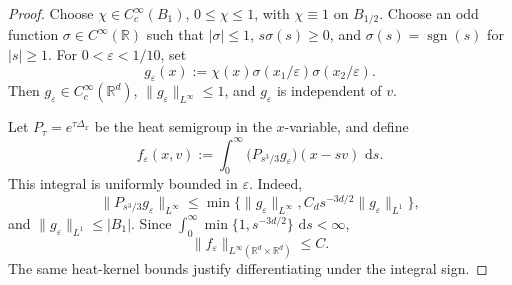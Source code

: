 \documentclass[11pt,reqno]{amsart}
\numberwithin{equation}{section}
\theoremstyle{remark}
\newcommand{\R}{\mathbb{R}}
\newcommand{\dd}{\,\mathrm{d}}
\begin{document}
\begin{proof}
Choose \(\chi\in C_c^\infty(B_1)\), \(0\le\chi\le1\), with
\(\chi\equiv1\) on \(B_{1/2}\).  Choose an odd function
\(\sigma\in C^\infty(\R)\) such that \(|\sigma|\le1\),
\(s\sigma(s)\ge0\), and \(\sigma(s)=\operatorname{sgn}(s)\) for
\(|s|\ge1\).  For \(0<\varepsilon<1/10\), set
\begin{equation}\label{eq:g-eps-def}
   g_\varepsilon(x)
   :=\chi(x)\sigma(x_1/\varepsilon)\sigma(x_2/\varepsilon).
\end{equation}
Then \(g_\varepsilon\in C_c^\infty(\R^d)\), \(\|g_\varepsilon\|_{L^\infty}\le1\),
and \(g_\varepsilon\) is independent of \(v\).

Let \(P_\tau=e^{\tau\Delta_x}\) be the heat semigroup in the \(x\)-variable,
and define
\begin{equation}\label{eq:f-eps-resolvent}
   f_\varepsilon(x,v)
   :=\int_0^\infty
      \big(P_{s^3/3}g_\varepsilon\big)(x-sv)\,\dd s.
\end{equation}
This integral is uniformly bounded in \(\varepsilon\).  Indeed,
\[
   \|P_{s^3/3}g_\varepsilon\|_{L^\infty}
   \le
   \min\big\{\|g_\varepsilon\|_{L^\infty},
          C_d s^{-3d/2}\|g_\varepsilon\|_{L^1}\big\},
\]
and \(\|g_\varepsilon\|_{L^1}\le |B_1|\).  Since
\(\int_0^\infty \min\{1,s^{-3d/2}\}\,\dd s<\infty\),
\[
   \|f_\varepsilon\|_{L^\infty(\R^d\times\R^d)}\le C.
\]
The same heat-kernel bounds justify differentiating under the integral sign.


\end{proof}
\end{document}
